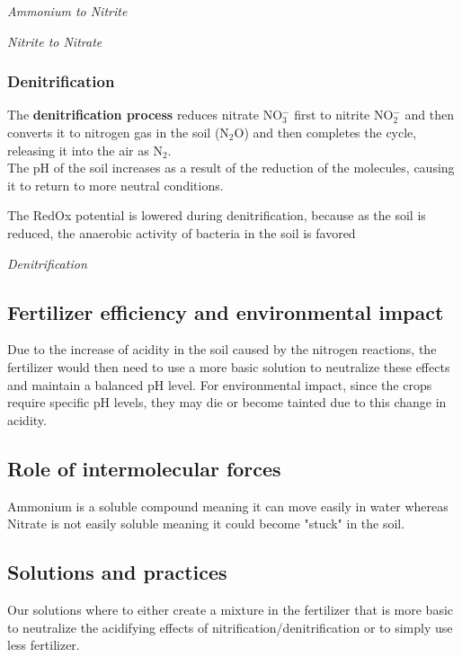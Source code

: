 \documentclass{article}
\begin{document}
\textit{Ammonium to Nitrite}\\

\textit{Nitrite to Nitrate}\\

\subsubsection{Denitrification}
The \textbf{denitrification process} reduces nitrate NO$_3^-$ first to nitrite NO$_2^-$ and then
converts it to nitrogen gas in the soil (N$_2$O) and then completes the cycle, releasing
it into the air as N$_2$.\\
The pH of the soil increases as a result of the reduction of the molecules, causing it to
return to more neutral conditions.

The RedOx potential is lowered during denitrification, because as the soil is reduced,
the anaerobic activity of bacteria in the soil is favored

\textit{Denitrification}\\

\newpage
\subsection{Fertilizer efficiency and environmental impact}
Due to the increase of acidity in the soil caused by the nitrogen reactions, the fertilizer
would then need to use a more basic solution to neutralize these effects and maintain a
balanced pH level. For environmental impact, since the crops require specific pH levels,
they may die or become tainted due to this change in acidity.

\subsection{Role of intermolecular forces}
Ammonium is a soluble compound meaning it can move easily in water whereas Nitrate is not
easily soluble meaning it could become "stuck" in the soil.

\subsection{Solutions and practices}
Our solutions where to either create a mixture in the fertilizer that is more basic to
neutralize the acidifying effects of nitrification/denitrification or to simply use less
fertilizer.
\end{document}
